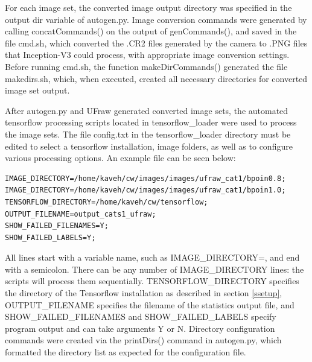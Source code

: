 \documentclass{report}
\begin{document}
For each image set, the converted image output directory was specified in the output dir variable of autogen.py. Image conversion commands were generated by calling concatCommands() on the output of genCommands(), and saved in the file cmd.sh, which converted the .CR2 files generated by the camera to .PNG files that Inception-V3 could process, with appropriate image conversion settings. Before running cmd.sh, the function makeDirCommands() generated the file makedirs.sh, which, when executed, created all necessary directories for converted image set output. 

After autogen.py and UFraw generated converted image sets, the automated tensorflow processing scripts located in tensorflow\_loader were used to process the image sets. The file config.txt in the tensorflow\_loader directory must be edited to select a tensorflow installation, image folders, as well as to configure various processing options. An example file can be seen below:

\begin{verbatim}
IMAGE_DIRECTORY=/home/kaveh/cw/images/images/ufraw_cat1/bpoin0.8;
IMAGE_DIRECTORY=/home/kaveh/cw/images/images/ufraw_cat1/bpoin1.0;
TENSORFLOW_DIRECTORY=/home/kaveh/cw/tensorflow;
OUTPUT_FILENAME=output_cats1_ufraw;
SHOW_FAILED_FILENAMES=Y;
SHOW_FAILED_LABELS=Y;
\end{verbatim}

All lines start with a variable name, such as IMAGE\_DIRECTORY=, and end with a semicolon. There can be any number of IMAGE\_DIRECTORY lines: the scripts will process them sequentially. TENSORFLOW\_DIRECTORY specifies the directory of the Tensorflow installation as described in section \ref{ssetup}, OUTPUT\_FILENAME specifies the filename of the statistics output file, and SHOW\_FAILED\_FILENAMES and SHOW\_FAILED\_LABELS specify program output and can take arguments Y or N. Directory configuration commands were created via the printDirs() command in autogen.py, which formatted the directory list as expected for the configuration file.
\end{document}
